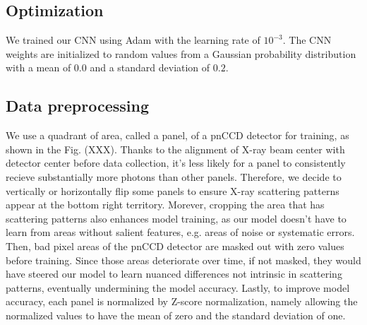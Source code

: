 \subsection{Optimization}


We trained our CNN using Adam \cite{kingmaAdamMethodStochastic2017} with the
learning rate of $10^{-3}$.  The CNN weights are initialized to random values
from a Gaussian probability distribution with a mean of $0.0$ and a standard
deviation of $0.2$.  

\subsection{Data preprocessing}

We use a quadrant of area, called a panel, of a pnCCD detector for training, as
shown in the Fig. (XXX).  Thanks to the alignment of X-ray beam center with
detector center before data collection, it's less likely for a panel to
consistently recieve substantially more photons than other panels.  Therefore,
we decide to vertically or horizontally flip some panels to ensure X-ray
scattering patterns appear at the bottom right territory.  Morever, cropping the
area that has scattering patterns also enhances model training, as our model
doesn't have to learn from areas without salient features, e.g. areas of noise
or systematic errors.  Then, bad pixel areas of the pnCCD detector are masked
out with zero values before training.  Since those areas deteriorate over time,
if not masked, they would have steered our model to learn nuanced differences
not intrinsic in scattering patterns, eventually undermining the model accuracy.
Lastly, to improve model accuracy, each panel is normalized by Z-score
normalization, namely allowing the normalized values to have the mean of zero
and the standard deviation of one.  

